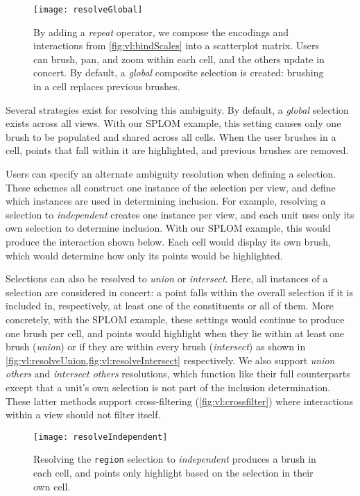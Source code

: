 \begin{figure}[b!]
  \centering
  \texttt{[image: resolveGlobal]}
  \caption{By adding a \emph{repeat} operator, we compose the encodings and
  interactions from \cref{fig:vl:bindScales} into a scatterplot matrix. Users can
  brush, pan, and zoom within each cell, and the others update in concert. By
  default, a \emph{global} composite selection is created: brushing in a cell
  replaces previous brushes.}
  \label{fig:vl:resolveGlobal}
\end{figure}

Several strategies exist for resolving this ambiguity. By default, a
\emph{global} selection exists across all views. With our SPLOM example, this
setting causes only one brush to be populated and shared across all cells. When
the user brushes in a cell, points that fall within it are highlighted, and
previous brushes are removed.

Users can specify an alternate ambiguity resolution when defining a selection.
These schemes all construct one instance of the selection per view, and define
which instances are used in determining inclusion. For example, resolving a
selection to \emph{independent} creates one instance per view, and each unit
uses only its own selection to determine inclusion. With our SPLOM example, this
would produce the interaction shown below. Each cell would display its own
brush, which would determine how only its points would be highlighted.

Selections can also be resolved to \emph{union} or \emph{intersect}. Here, all
instances of a selection are considered in concert: a point falls within the
overall selection if it is included in, respectively, at least one of the
constituents or all of them. More concretely, with the SPLOM example, these
settings would continue to produce one brush per cell, and points would
highlight when they lie within at least one brush (\emph{union}) or if they are
within every brush (\emph{intersect}) as shown in
\cref{fig:vl:resolveUnion,fig:vl:resolveIntersect} respectively. We also support
\emph{union others} and \emph{intersect others} resolutions, which function like
their full counterparts except that a unit's own selection is not part of the
inclusion determination. These latter methods support cross-filtering
(\cref{fig:vl:crossfilter}) where interactions within a view should not filter
itself.

\begin{figure}[h!]
  \centering
  \texttt{[image: resolveIndependent]}
  \caption{Resolving the \texttt{region} selection to \emph{independent}
produces a brush in each cell, and points only highlight based on the selection
in their own cell.}
  \label{fig:vl:resolveIndependent}
\end{figure}

